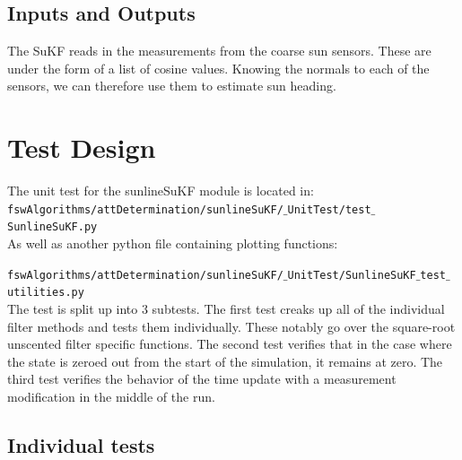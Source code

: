 \documentclass[]{BasiliskReportMemo}
\begin{document}
\subsection{Inputs and Outputs}

The SuKF reads in the measurements from the coarse sun sensors. These are under the form of a list of cosine values. Knowing the normals to each of the sensors, we can therefore use them to estimate sun heading.


\section{Test Design}
The unit test for the sunlineSuKF module is located in:\\

\noindent
{\tt fswAlgorithms/attDetermination/sunlineSuKF/$\_$UnitTest/test$\_$SunlineSuKF.py} \\

As well as another python file containing plotting functions:

\noindent
{\tt fswAlgorithms/attDetermination/sunlineSuKF/$\_$UnitTest/SunlineSuKF$\_$test$\_$utilities.py} \\

The test is split up into 3 subtests. The first test creaks up all of the individual filter methods and tests them individually. These notably go over the square-root unscented filter specific functions. The second test verifies that in the case where the state is zeroed out from the start of the simulation, it remains at zero. The third test verifies the behavior of the time update with a measurement modification in the middle of the run. 

\subsection{Individual tests}
\end{document}
